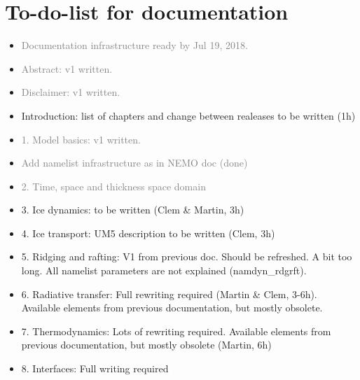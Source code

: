 \documentclass[../../tex_main/NEMO_manual]{subfiles}
\begin{document}

\chapter*{To-do-list for documentation}
\label{chap:TDL}

\begin{itemize}

\item \textcolor{gray}{Documentation infrastructure ready by Jul 19, 2018.}

\item \textcolor{gray}{Abstract: v1 written.}

\item \textcolor{gray}{Disclaimer: v1 written.}

\item Introduction: list of chapters and change between realeases to be written (1h)

\item \textcolor{gray}{1. Model basics: v1 written.}

\item \textcolor{gray}{Add namelist infrastructure as in NEMO doc (done)}

\item \textcolor{gray}{2. Time, space and thickness space domain}

\item 3. Ice dynamics: to be written (Clem \& Martin, 3h)

\item 4. Ice transport: UM5 description to be written (Clem, 3h)

\item 5. Ridging and rafting: V1 from previous doc. Should be refreshed. A bit too long. All namelist parameters are not explained (namdyn\_rdgrft).

\item 6. Radiative transfer: Full rewriting required (Martin \& Clem, 3-6h). Available elements from previous documentation, but mostly obsolete.

\item 7. Thermodynamics: Lots of rewriting required. Available elements from previous documentation, but mostly obsolete (Martin, 6h)

\item 8. Interfaces: Full writing required 


\end{itemize}
\end{document}
